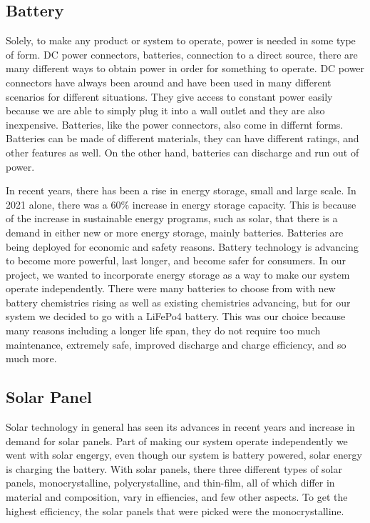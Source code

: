 \documentclass[journal]{IEEEtran}
\begin{document}
\subsection{Battery} \label{sec:battery}
Solely, to make any product or system to operate, power is needed in some type of form. DC power 
connectors, batteries, connection to a direct source, there are many different ways to obtain power 
in order for something to operate. DC power connectors have always been around and have been used 
in many different scenarios for different situations. They give access to constant power easily 
because we are able to simply plug it into a wall outlet and they are also inexpensive. Batteries, 
like the power connectors, also come in differnt forms. Batteries can be made of different materials, 
they can have different ratings, and other features as well. On the other hand, batteries can discharge 
and run out of power. 

In recent years, there has been a rise in energy storage, small and large scale. In 2021 alone, there 
was a 60\% increase in energy storage capacity. This is because of the increase in sustainable energy 
programs, such as solar, that there is a demand in either new or more energy storage, mainly batteries. 
Batteries are being deployed for economic and safety reasons. Battery technology is advancing to become 
more powerful, last longer, and become safer for consumers. In our project, we wanted to incorporate 
energy storage as a way to make our system operate independently. There were many batteries to choose 
from with new battery chemistries rising as well as existing chemistries advancing, but for our system 
we decided to go with a LiFePo4 battery. This was our choice because many reasons including a longer 
life span, they do not require too much maintenance, extremely safe, improved discharge and charge 
efficiency, and so much more. 
\subsection{Solar Panel} \label{sec:solar pane}
Solar technology in general has seen its advances in recent years and increase in demand for solar panels. 
Part of making our system operate independently we went with solar engergy, even though our system is 
battery powered, solar energy is charging the battery. With solar panels, there three different types of 
solar panels, monocrystalline, polycrystalline, and thin-film, all of which differ in material and 
composition, vary in effiencies, and few other aspects. To get the highest efficiency, the solar panels 
that were picked were the monocrystalline.
\end{document}

